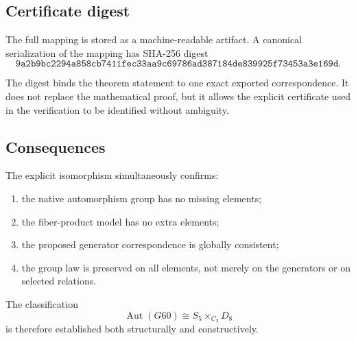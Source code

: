 \subsection{Certificate digest}

The full mapping is stored as a machine-readable artifact. A canonical
serialization of the mapping has SHA-256 digest
\[
\texttt{9a2b9bc2294a858cb7411fec33aa9c69786ad387184de839925f73453a3e169d}.
\]

The digest binds the theorem statement to one exact exported
correspondence. It does not replace the mathematical proof, but it
allows the explicit certificate used in the verification to be
identified without ambiguity.

\subsection{Consequences}

The explicit isomorphism simultaneously confirms:

\begin{enumerate}
\item the native automorphism group has no missing elements;
\item the fiber-product model has no extra elements;
\item the proposed generator correspondence is globally consistent;
\item the group law is preserved on all elements, not merely on the
generators or on selected relations.
\end{enumerate}

The classification
\[
\operatorname{Aut}(G60)
\cong
S_5\times_{C_2}D_8
\]
is therefore established both structurally and constructively.
